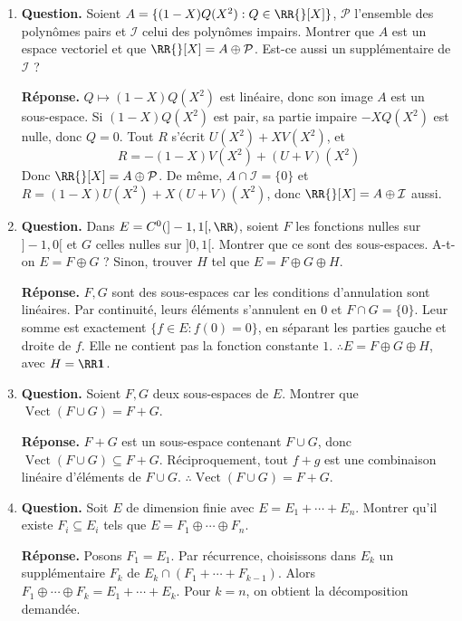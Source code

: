\documentclass[12pt, a4paper]{article}
\begin{document}
\begin{enumerate}[label=6.\arabic*., start=105]
  \item \begin{minipage}[t]{\linewidth}\raggedright
\textbf{Question.} Soient $A=\{(1-X)Q(X^2):Q\in\RR{}[X]\}$, $\mathcal P$ l’ensemble des polynômes pairs et $\mathcal I$ celui des polynômes impairs. Montrer que $A$ est un espace vectoriel et que $\RR{}[X]=A\oplus\mathcal P$. Est-ce aussi un supplémentaire de $\mathcal I$ ?
\par\smallskip
\textbf{Réponse.} $Q\mapsto(1-X)Q(X^2)$ est linéaire, donc son image $A$ est un sous-espace.
    Si $(1-X)Q(X^2)$ est pair, sa partie impaire $-XQ(X^2)$ est nulle, donc $Q=0$.
    Tout $R$ s'écrit $U(X^2)+XV(X^2)$, et
    \[
      R=-(1-X)V(X^2)+(U+V)(X^2)
    \]
    Donc $\RR{}[X]=A\oplus\mathcal P$.
    De même, $A\cap\mathcal I=\{0\}$ et
    $R=(1-X)U(X^2)+X(U+V)(X^2)$, donc $\RR{}[X]=A\oplus\mathcal I$ aussi.
\end{minipage}

  \item \begin{minipage}[t]{\linewidth}\raggedright
\textbf{Question.} Dans $E=C^0(]-1,1[,\RR)$, soient $F$ les fonctions nulles sur $]-1,0[$ et $G$ celles nulles sur $]0,1[$. Montrer que ce sont des sous-espaces. A-t-on $E=F\oplus G$ ? Sinon, trouver $H$ tel que $E=F\oplus G\oplus H$.
\par\smallskip
\textbf{Réponse.} $F,G$ sont des sous-espaces car les conditions d'annulation sont linéaires.
    Par continuité, leurs éléments s'annulent en $0$ et $F\cap G=\{0\}$.
    Leur somme est exactement $\{f\in E:f(0)=0\}$, en séparant les parties gauche et droite de $f$.
    Elle ne contient pas la fonction constante $1$.
    $\therefore E=F\oplus G\oplus H$, avec $H=\RR\boldsymbol{1}$.
\end{minipage}

  \item \begin{minipage}[t]{\linewidth}\raggedright
\textbf{Question.} Soient $F,G$ deux sous-espaces de $E$. Montrer que $\operatorname{Vect}(F\cup G)=F+G$.
\par\smallskip
\textbf{Réponse.} $F+G$ est un sous-espace contenant $F\cup G$, donc $\operatorname{Vect}(F\cup G)\subseteq F+G$.
    Réciproquement, tout $f+g$ est une combinaison linéaire d'éléments de $F\cup G$.
    $\therefore\operatorname{Vect}(F\cup G)=F+G$.
\end{minipage}

  \item \begin{minipage}[t]{\linewidth}\raggedright
\textbf{Question.} Soit $E$ de dimension finie avec $E=E_1+\cdots+E_n$. Montrer qu’il existe $F_i\subseteq E_i$ tels que $E=F_1\oplus\cdots\oplus F_n$.
\par\smallskip
\textbf{Réponse.} Posons $F_1=E_1$. Par récurrence, choisissons dans $E_k$ un supplémentaire $F_k$ de
    $E_k\cap(F_1+\cdots+F_{k-1})$.
    Alors $F_1\oplus\cdots\oplus F_k=E_1+\cdots+E_k$.
    Pour $k=n$, on obtient la décomposition demandée.
\end{minipage}


\end{enumerate}
\end{document}
